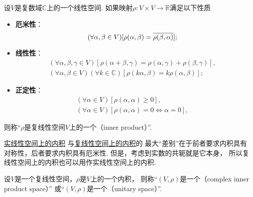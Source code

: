 \begin{definition}\label{definition:酉空间.复线性空间上的内积}
设\(V\)是复数域\(\mathbb{C}\)上的一个线性空间.
如果映射\(\rho\colon V \times V \to \mathbb{R}\)满足以下性质\begin{itemize}
	\item {\rm\bf 厄米性}：\begin{equation*}
		(\forall \alpha,\beta \in V)
		[
			\rho(\alpha,\beta)
			= \overline{\rho(\beta,\alpha)}
		];
	\end{equation*}

	\item {\rm\bf 线性性}：\begin{gather*}
		(\forall \alpha,\beta,\gamma \in V)
		[
			\rho(\alpha+\beta,\gamma)
			= \rho(\alpha,\gamma) + \rho(\beta,\gamma)
		], \\
		(\forall \alpha,\beta \in V)
		(\forall k \in \mathbb{C})
		[
			\rho(k\alpha,\beta)
			= k\rho(\alpha,\beta)
		];
	\end{gather*}

	\item {\rm\bf 正定性}：\begin{gather*}
		(\forall \alpha \in V)
		[
			\rho(\alpha,\alpha) \geq 0
		], \\
		(\forall \alpha \in V)
		[
			\rho(\alpha,\alpha) = 0
			\iff
			\alpha = 0
		],
	\end{gather*}
\end{itemize}
则称“\(\rho\)是复线性空间\(V\)上的一个（inner product）”.
\end{definition}
\begin{remark}
\hyperref[definition:欧几里得空间.实线性空间上的内积]{实线性空间上的内积}%
与\hyperref[definition:酉空间.复线性空间上的内积]{复线性空间上的内积}的
最大“差别”在于前者要求内积具有对称性，后者要求内积具有厄米性.
但是，考虑到实数的共轭就是它本身，
所以复线性空间上的内积也可以用作实线性空间上的内积.
\end{remark}

\begin{definition}
设\(V\)是一个复线性空间，\(\rho\)是\(V\)上的一个内积，
则称“\((V,\rho)\)是一个（complex inner product space）”
或“\((V,\rho)\)是一个（unitary space）”.
\end{definition}

